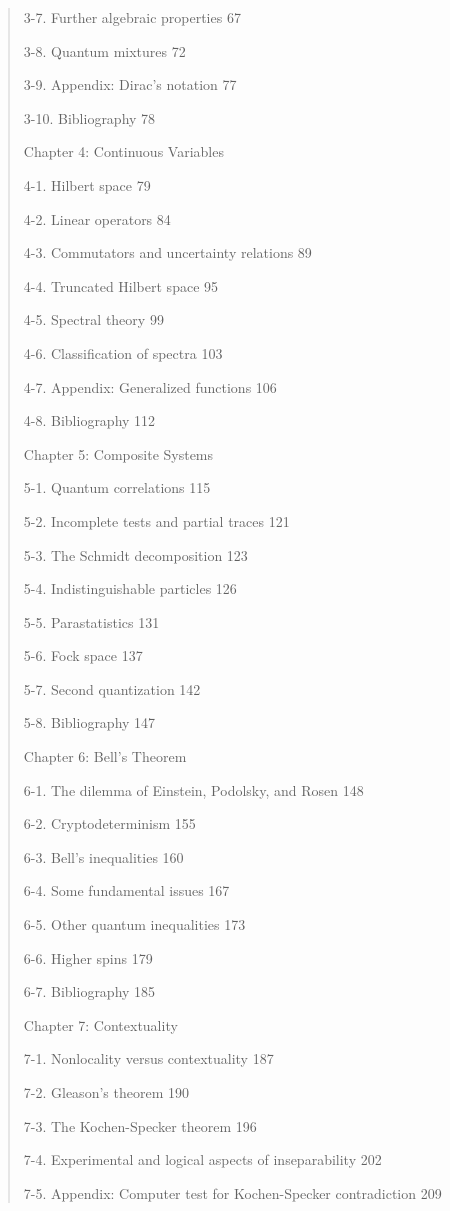 \documentclass{article}
\begin{document}
\begin{quote}
3-7. Further algebraic properties 67

3-8. Quantum mixtures 72

3-9. Appendix: Dirac's notation 77

3-10. Bibliography 78

Chapter 4: Continuous Variables

4-1. Hilbert space 79

4-2. Linear operators 84

4-3. Commutators and uncertainty relations 89

4-4. Truncated Hilbert space 95

4-5. Spectral theory 99

4-6. Classification of spectra 103

4-7. Appendix: Generalized functions 106

4-8. Bibliography 112

Chapter 5: Composite Systems

5-1. Quantum correlations 115

5-2. Incomplete tests and partial traces 121

5-3. The Schmidt decomposition 123

5-4. Indistinguishable particles 126

5-5. Parastatistics 131

5-6. Fock space 137

5-7. Second quantization 142

5-8. Bibliography 147

Chapter 6: Bell's Theorem

6-1. The dilemma of Einstein, Podolsky, and Rosen 148

6-2. Cryptodeterminism 155

6-3. Bell's inequalities 160

6-4. Some fundamental issues 167

6-5. Other quantum inequalities 173

6-6. Higher spins 179

6-7. Bibliography 185

Chapter 7: Contextuality

7-1. Nonlocality versus contextuality 187

7-2. Gleason's theorem 190

7-3. The Kochen-Specker theorem 196

7-4. Experimental and logical aspects of inseparability 202

7-5. Appendix: Computer test for Kochen-Specker contradiction 209


\end{quote}
\end{document}
